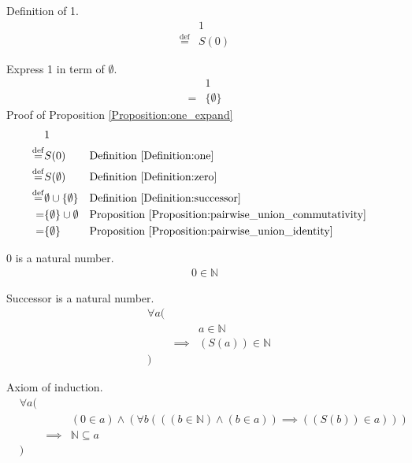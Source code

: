 \begin{defn}
\label{Definition:one}
Definition of 1.
\begin{align*}
& 1 \\
\overset{\operatorname{def}}{=} & S(0)
\end{align*}
\end{defn}

\begin{prop}
\label{Proposition:one_expand}
Express 1 in term of $\emptyset$.
\begin{align*}
& 1 \\
= & \{ \emptyset \}
\end{align*}
Proof of Proposition \ref{Proposition:one_expand}
\begin{align*}
& 1 \\
\overset{\operatorname{def}}{=} & S(0)
& & \text{Definition \ref{Definition:one}} \\
\overset{\operatorname{def}}{=} & S(\emptyset)
& & \text{Definition \ref{Definition:zero}} \\
\overset{\operatorname{def}}{=} & \emptyset \cup \{ \emptyset \}
& & \text{Definition \ref{Definition:successor}} \\
= & \{ \emptyset \} \cup \emptyset
& & \text{Proposition \ref{Proposition:pairwise_union_commutativity}} \\
= & \{ \emptyset \}
& & \text{Proposition \ref{Proposition:pairwise_union_identity}} \\
\end{align*}
\end{prop}

\begin{axm}
\label{Axiom:zero_is_natural_number}
0 is a natural number.
\begin{align*}
0 \in \mathbb{N}
\end{align*}
\end{axm}

\begin{axm}
\label{Axiom:successor_is_natural_number}
Successor is a natural number.
\begin{align*}
& \forall a ( \\
& & & a \in \mathbb{N} \\
& & \implies & (S(a)) \in \mathbb{N} \\
& )
\end{align*}
\end{axm}

\begin{axm}
\label{Axiom:induction}
Axiom of induction.
\begin{align*}
& \forall a ( \\
& & & (0 \in a) \land (\forall b (((b \in \mathbb{N}) \land (b \in a)) \implies ((S(b)) \in a))) \\
& & \implies & \mathbb{N} \subseteq a \\
& )
\end{align*}
\end{axm}

